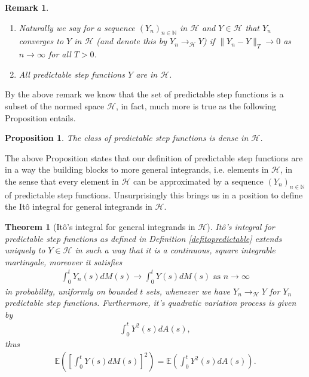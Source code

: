 \documentclass[11pt,a4paper, final]{article}
\newtheorem{thm}{Theorem}[section]
\newtheorem{prop}{Proposition}[section]
\newtheorem{rem}{Remark}[defn]
\begin{document}
\begin{rem} \ \begin{enumerate}
\item Naturally we say for a sequence $(Y_n)_{n \in \mathbb{N}}$ in $\mathcal{H}$ and $Y \in \mathcal{H}$ that $Y_n$ converges to $Y$ in $\mathcal{H}$ (and denote this by $Y_n \to_\mathcal{H} Y$) if $\| Y_n - Y \|_T \to 0$ as $n \to \infty$ for all $T >0$. 
\item All predictable step functions $Y$ are in $\mathcal{H}$.
\end{enumerate}
\end{rem}
\noindent By the above remark we know that the set of predictable step functions is a subset of the normed space $\mathcal{H}$, in fact, much more is true as the following Proposition entails.
\begin{prop}
The class of predictable step functions is dense in $\mathcal{H}$.
\end{prop}
\noindent The above Proposition states that our definition of predictable step functions are in a way the building blocks to more general integrands, i.e. elements in $\mathcal{H}$, in the sense that every element in $\mathcal{H}$ can be approximated by a sequence $(Y_n)_{n \in \mathbb{N}}$ of predictable step functions.  Unsurprisingly this brings us in a position to define the Itô integral for general integrands in $\mathcal{H}$. 
\begin{thm}[Itô's integral for general integrands in $\mathcal{H}$] Itô's integral for predictable step functions as defined in Definition \ref{defitopredictable} extends uniquely to $Y \in \mathcal{H}$ in such a way that it is a continuous, square integrable martingale, moreover it satisfies 
\begin{align*}
\int_0^t Y_n(s) dM(s) \to \int_0^t Y(s) dM(s) \text{ as } n \to \infty
\end{align*}
in probability, uniformly on bounded $t$ sets, whenever we have $Y_n \to_\mathcal{H} Y$ for $Y_n$ predictable step functions. Furthermore, it's quadratic variation process is given by 
\begin{align*}
\int_0^t Y^2(s) dA(s),
\end{align*}
thus 
\begin{align*}
\mathbb{E} \left( \left[ \int_0^t Y(s) dM(s) \right]^2 \right) = \mathbb{E} \left( \int_0^t Y^2(s) dA(s) \right). 
\end{align*}
\end{thm}
\newpage
\end{document}
